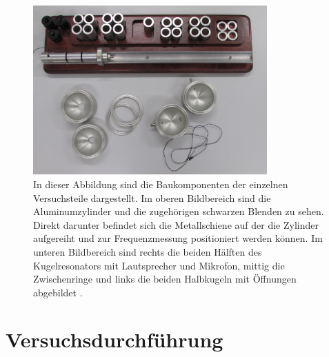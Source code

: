 \begin{figure}
    \centering
    \includegraphics[width=0.8\textwidth]{figure/Aufbau.pdf}
    \caption{
            In dieser Abbildung sind die Baukomponenten der einzelnen Versuchsteile 
            dargestellt. Im oberen Bildbereich sind die Aluminumzylinder und die 
            zugehörigen schwarzen Blenden zu sehen. Direkt darunter befindet sich die 
            Metallschiene auf der die Zylinder aufgereiht und zur Frequenzmessung 
            positioniert werden können. Im unteren Bildbereich sind rechts die beiden 
            Hälften des Kugelresonators mit Lautsprecher und Mikrofon, mittig die 
            Zwischenringe und links die beiden Halbkugeln mit Öffnungen abgebildet 
            \cite{sample}.
            }
\end{figure}




\section{Versuchsdurchführung}
\label{sec:Versuchsdurchführung}
